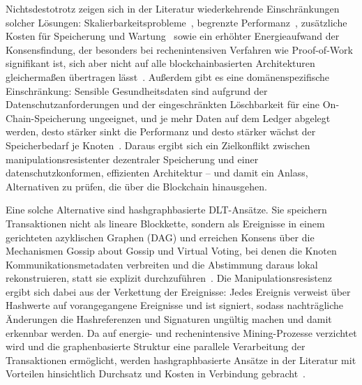 Nichtsdestotrotz zeigen sich in der Literatur wiederkehrende Einschränkungen solcher Lösungen: Skalierbarkeitsprobleme~\cite{mazlan2020}, begrenzte Performanz~\cite{singh2021}, zusätzliche Kosten für Speicherung und Wartung~\cite{kasyapa2024} sowie ein erhöhter Energieaufwand der Konsensfindung, der besonders bei rechenintensiven Verfahren wie Proof-of-Work signifikant ist, sich aber nicht auf alle blockchainbasierten Architekturen gleichermaßen übertragen lässt~\cite{bada2021}. Außerdem gibt es eine domänenspezifische Einschränkung: Sensible Gesundheitsdaten sind aufgrund der Datenschutzanforderungen und der eingeschränkten Löschbarkeit für eine On-Chain-Speicherung ungeeignet, und je mehr Daten auf dem Ledger abgelegt werden, desto stärker sinkt die Performanz und desto stärker wächst der Speicherbedarf je Knoten~\cite{mazlan2020}. Daraus ergibt sich ein Zielkonflikt zwischen manipulationsresistenter dezentraler Speicherung und einer datenschutzkonformen, effizienten Architektur -- und damit ein Anlass, Alternativen zu prüfen, die über die Blockchain hinausgehen.

Eine solche Alternative sind hashgraphbasierte DLT-Ansätze. Sie speichern Transaktionen nicht als lineare Blockkette, sondern als Ereignisse in einem gerichteten azyklischen Graphen (DAG) und erreichen Konsens über die Mechanismen Gossip about Gossip und Virtual Voting, bei denen die Knoten Kommunikationsmetadaten verbreiten und die Abstimmung daraus lokal rekonstruieren, statt sie explizit durchzuführen~\cite{baird2016}. Die Manipulationsresistenz ergibt sich dabei aus der Verkettung der Ereignisse: Jedes Ereignis verweist über Hashwerte auf vorangegangene Ereignisse und ist signiert, sodass nachträgliche Änderungen die Hashreferenzen und Signaturen ungültig machen und damit erkennbar werden. Da auf energie- und rechenintensive Mining-Prozesse verzichtet wird und die graphenbasierte Struktur eine parallele Verarbeitung der Transaktionen ermöglicht, werden hashgraphbasierte Ansätze in der Literatur mit Vorteilen hinsichtlich Durchsatz und Kosten in Verbindung gebracht~\cite{akhtar2019}.

